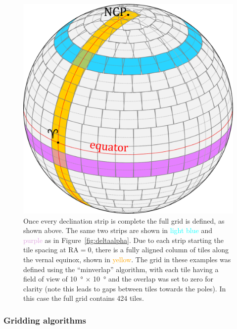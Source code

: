 \begin{colsection}
\begin{colsection}
\begin{figure}[p]
\begin{center}
\includegraphics[width=\linewidth]{images/globe4.pdf}
\end{center}
\caption[A fully tiled sphere]{Once every declination strip is complete the full grid is defined, as shown above. The same two strips are shown in \textcolor{cyan}{light blue} and \textcolor{Plum}{purple} as in Figure~\ref{fig:deltaalpha}. Due to each strip starting the tile spacing at RA$=0$, there is a fully aligned column of tiles along the vernal equinox, shown in \textcolor{orange}{yellow}. The grid in these examples was defined using the ``minverlap'' algorithm, with each tile having a field of view of \SI{10}{\degree} $\times$ \SI{10}{\degree} and the overlap was set to zero for clarity (note this leads to gaps between tiles towards the poles). In this case the full grid contains 424 tiles.
\\
}
\label{fig:tiledsphere}
\end{figure}

\newpage

\subsubsection{Gridding algorithms}


\end{colsection}
\end{colsection}

